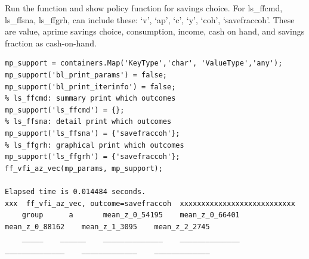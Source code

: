 \documentclass[
]{book}
\begin{document}
Run the function and show policy function for savings choice. For
ls\_ffcmd, ls\_ffsna, ls\_ffgrh, can include these: `v', `ap', `c', `y',
`coh', `savefraccoh'. These are value, aprime savings choice,
consumption, income, cash on hand, and savings fraction as cash-on-hand.

\begin{verbatim}
mp_support = containers.Map('KeyType','char', 'ValueType','any');
mp_support('bl_print_params') = false;
mp_support('bl_print_iterinfo') = false;
% ls_ffcmd: summary print which outcomes
mp_support('ls_ffcmd') = {};
% ls_ffsna: detail print which outcomes
mp_support('ls_ffsna') = {'savefraccoh'};
% ls_ffgrh: graphical print which outcomes
mp_support('ls_ffgrh') = {'savefraccoh'};
ff_vfi_az_vec(mp_params, mp_support);

Elapsed time is 0.014484 seconds.
xxx  ff_vfi_az_vec, outcome=savefraccoh  xxxxxxxxxxxxxxxxxxxxxxxxxxx
    group      a       mean_z_0_54195    mean_z_0_66401    mean_z_0_88162    mean_z_1_3095    mean_z_2_2745
    _____    ______    ______________    ______________    ______________    _____________    _____________


\end{verbatim}
\end{document}

